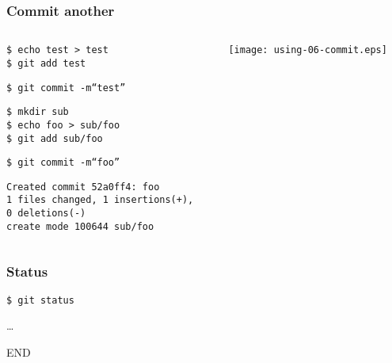 \documentclass[english]{beamer}
\newcommand{\CMD}[1]{
  \texttt{\textcolor{code-green}{#1}}
}
\newcommand{\cmd}[1]{
  \texttt{\textcolor{code-orange}{#1}}
}
\newcommand{\fnt}[1]{
  \texttt{\textcolor{code-gray}{#1}}
}
\begin{document}
\begin{frame}
\frametitle{Commit another}
\begin{columns}[t]
        \begin{column}[T]{.5\textwidth}
                \cmd{\$ echo test > test} \\
                \CMD{\$ git add test}

                \vspace{.1\textheight}

                \CMD{\$ git commit -m``test''} \\

                \vspace{.1\textheight}

                \cmd{\$ mkdir sub} \\
                \cmd{\$ echo foo > sub/foo} \\
                \CMD{\$ git add sub/foo}

                \vspace{.1\textheight}

                \CMD{\$ git commit -m``foo''} \\
                {\tiny
                \fnt{Created commit 52a0ff4: foo \\
                       1 files changed, 1 insertions(+), \\ 0 deletions(-) \\
                       create mode 100644 sub/foo}
                }
        \end{column}
        \begin{column}[T]{.5\textwidth}

                \texttt{[image: using-06-commit.eps]}

        \end{column}
\end{columns}
\end{frame}

\begin{frame}
\frametitle{Status}

\CMD{\$ git status}

\pause{}
\vspace{.1\textheight}

\ldots

\end{frame}





\begin{frame}
        END
\end{frame}

\end{document}
